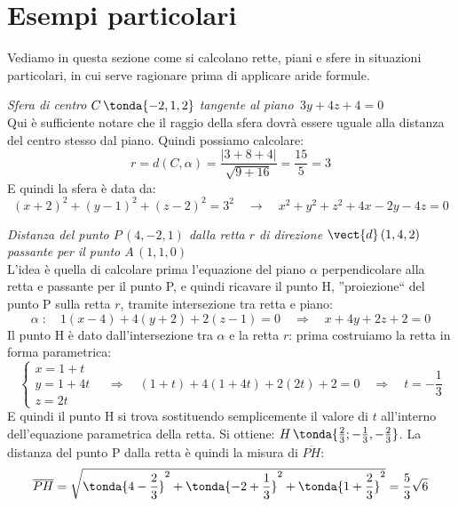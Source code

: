 \section{Esempi particolari}

Vediamo in questa sezione come si calcolano rette, piani e sfere in situazioni particolari, in cui serve ragionare prima di applicare aride formule.

\begin{esempio}
 \emph{Sfera di centro $C\,\tonda{-2,1,2}$ tangente al piano \,$3y+4z+4=0$}\\[7pt]
 Qui è sufficiente notare che il raggio della sfera dovrà essere uguale alla distanza del centro stesso dal piano. Quindi possiamo calcolare:
 \[r = d(C,\alpha) = \frac{|3+8+4|}{\sqrt{9+16}} = \frac{15}{5} = 3\]
 E quindi la sfera è data da:
 \[(x+2)^2+(y-1)^2+(z-2)^2=3^2 \quad \longrightarrow \quad x^2+y^2+z^2+4x-2y-4z=0\]
\end{esempio}

\begin{esempio}
 \emph{Distanza del punto $P\,(4,-2,1)$ dalla retta $r$ di direzione $\vect{d} \, (1,4,2)$ passante per il punto $A\,(1,1,0)$}\\[7pt]
 L'idea è quella di calcolare prima l'equazione del piano $\alpha$ perpendicolare alla retta e passante per il punto P, e quindi ricavare il punto H, ''proiezione`` del punto P sulla retta $r$, tramite intersezione tra retta e piano:
 \[\alpha \;: \quad 1(x-4)+4(y+2)+2(z-1)=0 \quad \Rightarrow \quad x+4y+2z+2=0\]
 Il punto H è dato dall'intersezione tra $\alpha$ e la retta $r$: prima costruiamo la retta in forma parametrica:
 \[\begin{cases}
x = 1+t \\
y = 1+4t \\
z = 2t
\end{cases} \quad \Longrightarrow \quad (1+t)+4(1+4t)+2(2t)+2=0 \quad \Rightarrow \quad t = -\frac{1}{3}\]
E quindi il punto H si trova sostituendo semplicemente il valore di $t$ all'interno dell'equazione parametrica della retta. Si ottiene: \(H\,\tonda{\frac{2}{3};-\frac{1}{3},-\frac{2}{3}}\). La distanza del punto P dalla retta è quindi la misura di $\overline{PH}$:
\[\overline{PH} = \sqrt{\tonda{4-\frac{2}{3}}^2+\tonda{-2+\frac{1}{3}}^2+\tonda{1+\frac{2}{3}}^2} = \frac{5}{3}\sqrt{6}\]
\end{esempio}

